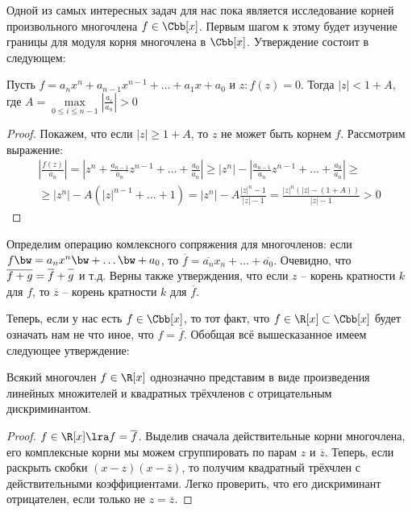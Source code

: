 Одной из самых интересных задач для нас пока является исследование корней произвольного многочлена $f\in\Cbb[x]$. Первым шагом к этому будет изучение границы для модуля корня многочлена в $\Cbb[x]$. Утверждение состоит в следующем:

\begin{theorem}
  Пусть $f=a_nx^n+a_{n-1}x^{n-1}+\dots+a_1x+a_0$ и $z\colon f(z)=0$. Тогда $|z|<1+A$, где $A=\max\limits_{0\le i\le n-1}\left|\frac{a_i}{a_n}\right|>0$
\end{theorem}
\begin{proof}
  Покажем, что если $|z|\ge1+A$, то $z$ не может быть корнем $f$. Рассмотрим выражение:
  \begin{multline*}
    \left|\frac{f(z)}{a_n}\right|=\left|z^n+\frac{a_{n-1}}{a_n}z^{n-1}+\dots+\frac{a_0}{a_n}\right|\ge|z^n|-\left|\frac{a_{n-1}}{a_n}z^{n-1}+\dots+\frac{a_0}{a_n}\right|\ge\\ \ge
    |z^n|-A\left(|z|^{n-1}+\dots+1\right)=|z^n|-A\frac{|z|^n-1}{|z|-1}=\frac{|z|^n(|z|-(1+A))}{|z|-1}>0
  \end{multline*}
\end{proof}

Определим операцию комлексного сопряжения для многочленов: если $f\bw=a_nx^n\bw+\dots\bw+a_0$, то $\overline{f}=\overline{a_n}x_n+\dots+\overline{a_0}$. Очевидно, что $\overline{f+g}=\overline{\mathstrut f}+\overline{\mathstrut g}$ и т.д. Верны также утверждения, что если $z$ -- корень кратности $k$ для $f$, то $\overline{z}$ -- корень кратности $k$ для $\overline{f}$.

Теперь, если у нас есть $f\in\Cbb[x]$, то тот факт, что $f\in\R[x]\subset\Cbb[x]$ будет означать нам не что иное, что $f=\overline{f}$. Обобщая всё вышесказанное имеем следующее утверждение:

\begin{theorem}
  Всякий многочлен $f\in\R[x]$ однозначно представим в виде произведения линейных множителей и квадратных трёхчленов с отрицательным дискриминантом.
\end{theorem}
\begin{proof}
  $f\in\R[x]\lra f=\overline{f}$. Выделив сначала действительные корни многочлена, его комплексные корни мы можем сгруппировать по парам $z$ и $\overline{z}$. Теперь, если раскрыть скобки $(x-z)(x-\overline{z})$, то получим квадратный трёхчлен с действительными коэффициентами. Легко проверить, что его дискриминант отрицателен, если только не $z=\overline{z}$.
\end{proof}

